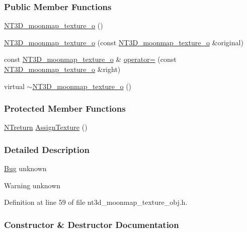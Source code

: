 \subsubsection*{Public Member Functions}
\begin{DoxyCompactItemize}
\item 
\hyperlink{class_n_t3_d__moonmap__texture__o_a7dea191959dcfaa3a0d5d18a003a8d4a}{NT3D\_\-moonmap\_\-texture\_\-o} ()
\item 
\hyperlink{class_n_t3_d__moonmap__texture__o_afe5b5f4475ea436eb9c6eaa92294ec68}{NT3D\_\-moonmap\_\-texture\_\-o} (const \hyperlink{class_n_t3_d__moonmap__texture__o}{NT3D\_\-moonmap\_\-texture\_\-o} \&original)
\item 
const \hyperlink{class_n_t3_d__moonmap__texture__o}{NT3D\_\-moonmap\_\-texture\_\-o} \& \hyperlink{class_n_t3_d__moonmap__texture__o_a21f0c5efefe8c06657a527b643580d30}{operator=} (const \hyperlink{class_n_t3_d__moonmap__texture__o}{NT3D\_\-moonmap\_\-texture\_\-o} \&right)
\item 
virtual \hyperlink{class_n_t3_d__moonmap__texture__o_a5a607213cd24010d8a1f06aa10be5ec6}{$\sim$NT3D\_\-moonmap\_\-texture\_\-o} ()
\end{DoxyCompactItemize}
\subsubsection*{Protected Member Functions}
\begin{DoxyCompactItemize}
\item 
\hyperlink{nt__types_8h_ab9564ee8f091e809d21b8451c6683c53}{NTreturn} \hyperlink{class_n_t3_d__moonmap__texture__o_a557531effda8f67ccbdbfbf2c5638106}{AssignTexture} ()
\end{DoxyCompactItemize}


\subsubsection{Detailed Description}
\begin{Desc}
\item[\hyperlink{bug__bug000022}{Bug}]unknown \end{Desc}
\begin{DoxyWarning}{Warning}
unknown 
\end{DoxyWarning}


Definition at line 59 of file nt3d\_\-moonmap\_\-texture\_\-obj.h.



\subsubsection{Constructor \& Destructor Documentation}
